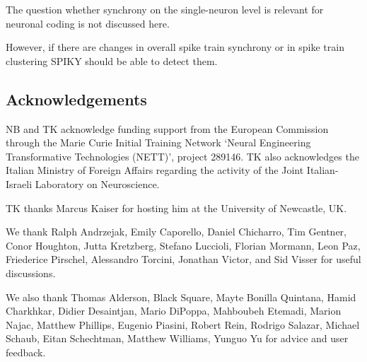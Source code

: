 \documentclass[10pt,twocolumn]{elsart5p}
\begin{document}
The question whether synchrony on the single-neuron level is relevant for neuronal coding is not discussed here.

However, if there are changes in overall spike train synchrony or in spike train clustering SPIKY should be able to detect them.


\vspace{1cm}

\begin{thanks}
\section{\label{s:Acknowledgement} \textbf{Acknowledgements}}

NB and TK acknowledge funding support from the European Commission through the Marie Curie Initial Training Network `Neural Engineering Transformative Technologies (NETT)', project 289146. TK also acknowledges the Italian Ministry of Foreign Affairs regarding the activity of the Joint Italian-Israeli Laboratory on Neuroscience.

TK thanks Marcus Kaiser for hosting him at the University of Newcastle, UK.
     
We thank Ralph Andrzejak, Emily Caporello, Daniel Chicharro, Tim Gentner, Conor Houghton, Jutta Kretzberg, Stefano Luccioli, Florian Mormann, Leon Paz, Friederice Pirschel, Alessandro Torcini, Jonathan Victor, and Sid Visser for useful discussions.

We also thank Thomas Alderson, Black Square, Mayte Bonilla Quintana, Hamid Charkhkar, Didier Desaintjan, Mario DiPoppa, Mahboubeh Etemadi, Marion Najac, Matthew Phillips, Eugenio Piasini, Robert Rein, Rodrigo Salazar, Michael Schaub, Eitan Schechtman, Matthew Williams, Yunguo Yu for advice and user feedback.
\end{thanks}



\end{document}
